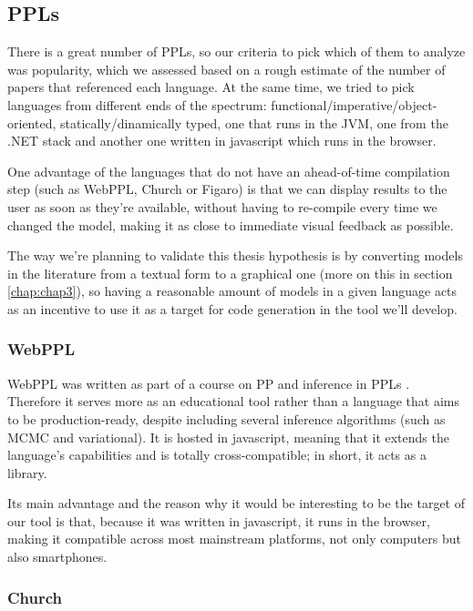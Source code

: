 \begin{itemsize}
\subsection{PPLs}
\label{sec:ppls}

There is a great number of PPLs, so our criteria to pick which of them to analyze
was popularity, which we assessed based on a rough estimate of the number of papers
that referenced each language.
At the same time, we tried to pick languages from different
ends of the spectrum: functional/imperative/object-oriented, statically/dinamically
typed, one that runs in the JVM, one from the .NET stack and another one written
in javascript which runs in the browser.

One advantage of the languages that do not have an ahead-of-time compilation step
(such as WebPPL, Church or Figaro) is that we can display results to the user
as soon as they're available, without having to re-compile every time we changed
the model, making it as close to immediate visual feedback as possible.

The way we're planning to validate this thesis hypothesis is by converting
models in the literature from a textual form to a graphical one (more on this in
section \ref{chap:chap3}), so having
a reasonable amount of models in a given language acts as an incentive to use
it as a target for code generation in the tool we'll develop.

\subsubsection{WebPPL}
\label{sec:webppl}

WebPPL was written as part of a course on PP and inference in PPLs \cite{dippl}.
Therefore it serves more as an educational tool rather than a language that aims
to be production-ready, despite including several inference algorithms (such as
MCMC and variational). It is hosted in javascript, meaning that it extends
the language's capabilities and is totally cross-compatible; in short, it acts
as a library.

Its main advantage and the reason why it would be interesting
to be the target of our tool is that, because it was written in javascript, it runs
in the browser, making it compatible
across most mainstream platforms, not only computers but also smartphones.

\subsubsection{Church}
\label{sec:church}


\end{itemsize}

